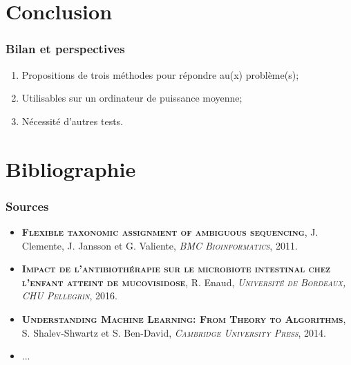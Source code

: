 \documentclass{beamer}
\begin{document}
\section{Conclusion}

\begin{frame}
\tableofcontents[currentsection]
\end{frame}

\begin{frame}
\frametitle{Bilan et perspectives}

\begin{enumerate}
\item Propositions de trois méthodes pour répondre au(x) problème(s);
\bigskip
\pause
\item Utilisables sur un ordinateur de puissance moyenne;
\bigskip
\pause
\item Nécessité d'autres tests.
\end{enumerate}

\end{frame}

\section{Bibliographie}
\begin{frame}
\frametitle{Sources}

\begin{itemize}
\item \textsc{ \bf Flexible taxonomic assignment of ambiguous sequencing}, J. Clemente, J. Jansson et G. Valiente, \textsc{ \it BMC Bioinformatics}, 2011.
\item \textsc{\bf Impact de l'antibiothérapie sur le microbiote intestinal chez l'enfant atteint de mucovisidose}, R. Enaud, \textsc{\it Université de Bordeaux, CHU Pellegrin}, 2016.
\item \textsc{\bf Understanding Machine Learning: From Theory to Algorithms}, S. Shalev-Shwartz et S. Ben-David, \textsc{\it Cambridge University Press}, 2014.
\item ...
\end{itemize}

\end{frame}
\end{document}
